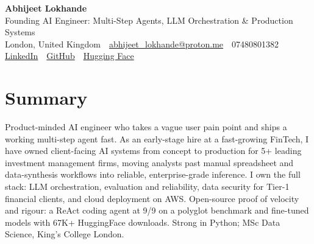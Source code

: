 \documentclass[10pt,a4paper]{article}
\newcommand{\sep}{\,\textcolor{accent!60}{\textbar}\,}
\begin{document}
\begin{center}
  {\fontsize{24}{26}\selectfont\bfseries Abhijeet Lokhande}\\[3pt]
  {\color{accent}\large Founding AI Engineer: Multi-Step Agents, LLM Orchestration \& Production Systems}\\[5pt]
  {\small
    London, United Kingdom \sep
    \href{mailto:abhijeet_lokhande@proton.me}{abhijeet\_lokhande@proton.me} \sep
    07480801382 \\[2pt]
    \href{https://www.linkedin.com/in/ablds/}{LinkedIn} \sep
    \href{https://github.com/abhijeetscode}{GitHub} \sep
    \href{https://huggingface.co/ab-ai}{Hugging Face}
  }
\end{center}
\vspace{2pt}

\section{Summary}
Product-minded AI engineer who takes a vague user pain point and ships a working multi-step agent fast. As an early-stage hire at a fast-growing FinTech, I have owned client-facing AI systems from concept to production for 5+ leading investment management firms, moving analysts past manual spreadsheet and data-synthesis workflows into reliable, enterprise-grade inference. I own the full stack: LLM orchestration, evaluation and reliability, data security for Tier-1 financial clients, and cloud deployment on AWS. Open-source proof of velocity and rigour: a ReAct coding agent at 9/9 on a polyglot benchmark and fine-tuned models with 67K+ HuggingFace downloads. Strong in Python; MSc Data Science, King's College London.

\end{document}
